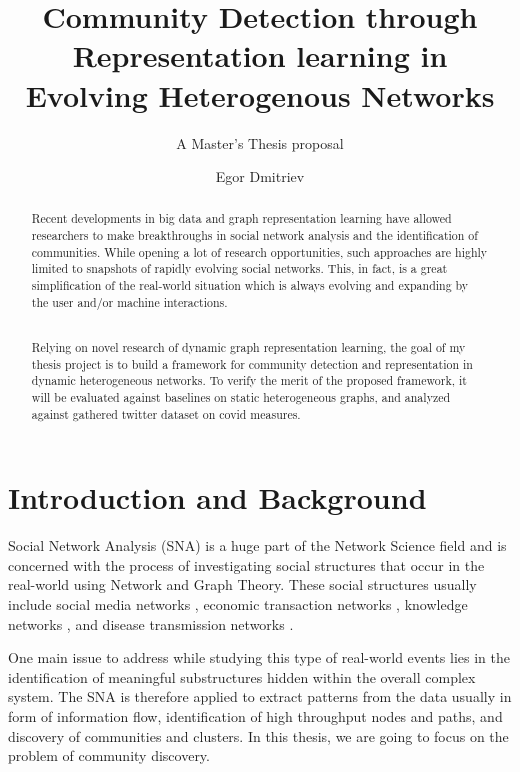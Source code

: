 \documentclass[
acmsmall,
nonacm,
screen,
acmthm]{acmart}
\title{Community Detection through Representation learning in Evolving
Heterogenous Networks}
\subtitle{A Master's Thesis proposal}
\author{Egor Dmitriev}
\affiliation{%
  \institution{Utrecht University}
  \country{The Netherlands}
}
\date{}
\begin{document}
\begin{abstract}
Recent developments in big data and graph representation learning have
allowed researchers to make breakthroughs in social network analysis and
the identification of communities. While opening a lot of research
opportunities, such approaches are highly limited to snapshots of
rapidly evolving social networks. This, in fact, is a great
simplification of the real-world situation which is always evolving and
expanding by the user and/or machine interactions.\\
\strut \\
Relying on novel research of dynamic graph representation learning, the
goal of my thesis project is to build a framework for community
detection and representation in dynamic heterogeneous networks. To
verify the merit of the proposed framework, it will be evaluated against
baselines on static heterogeneous graphs, and analyzed against gathered
twitter dataset on covid measures.
\end{abstract}
\maketitle



{
\setcounter{tocdepth}{2}
\tableofcontents
\pagebreak
}





\hypertarget{introduction-and-background}{%
\section{Introduction and
Background}\label{introduction-and-background}}

Social Network Analysis (SNA) is a huge part of the Network Science
field and is concerned with the process of investigating social
structures that occur in the real-world using Network and Graph Theory.
These social structures usually include social media networks
\citep{grandjeanSocialNetworkAnalysis2016, hagenCrisisCommunicationsAge2018},
economic transaction networks
\citep{prykeAnalysingConstructionProject2004, kongWhyAreSocial2011, swamynathanSocialNetworksImprove2008},
knowledge networks
\citep{gruberCollectiveKnowledgeSystems2008, brenneckeFirmKnowledgeNetwork2017},
and disease transmission networks
\citep{morrisNetworkEpidemiologyHandbook2004}.

One main issue to address while studying this type of real-world events
lies in the identification of meaningful substructures hidden within the
overall complex system. The SNA is therefore applied to extract patterns
from the data usually in form of information flow, identification of
high throughput nodes and paths, and discovery of communities and
clusters. In this thesis, we are going to focus on the problem of
community discovery.
\end{document}

